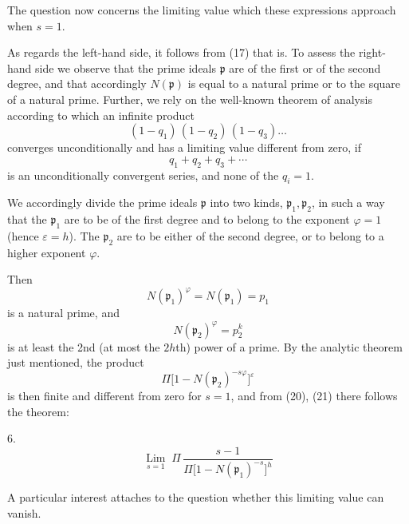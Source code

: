 
The question now concerns the limiting value which these expressions approach when $s=1$.

As regards the left-hand side, it follows from (17) that
is.
To assess the right-hand side we observe that the prime ideals $\mathfrak{p}$ are of the first or of the second degree, and that accordingly $N(\mathfrak{p})$ is equal to a natural prime or to the square of a natural prime. Further, we rely on the well-known theorem of analysis according to which an infinite product
\[
(1-q_1)\,(1-q_2)\,(1-q_3)\ldots
\]
converges unconditionally and has a limiting value different from zero, if
\[
q_1+q_2+q_3+\cdots
\]
is an unconditionally convergent series, and none of the $q_i=1$.

We accordingly divide the prime ideals $\mathfrak{p}$ into two kinds, $\mathfrak{p}_1, \mathfrak{p}_2$, in such a way that the $\mathfrak{p}_1$ are to be of the first degree and to belong to the exponent $\varphi=1$ (hence $\varepsilon=h$). The $\mathfrak{p}_2$ are to be either of the second degree, or to belong to a higher exponent $\varphi$. 

Then
\[
N(\mathfrak{p}_1)^{\varphi} = N(\mathfrak{p}_1) = p_1
\]
is a natural prime, and
\[
N(\mathfrak{p}_2)^{\varphi} = p_2^{k}
\]
is at least the 2nd (at most the $2h$th) power of a prime. By the analytic theorem just mentioned, the product
\[
\Pi\bigl[1-N(\mathfrak{p}_2)^{-s\varphi}\bigr]^{\varepsilon}
\]
is then finite and different from zero for $s=1$, and from (20), (21) there follows the theorem:

6. 
\[
\mathop{\mathrm{Lim}}\limits_{s=1} \; \Pi\,\dfrac{s-1}{\Pi\bigl[1-N(\mathfrak{p}_1)^{-s}\bigr]^{h}}
\]

A particular interest attaches to the question whether this limiting value can vanish.
